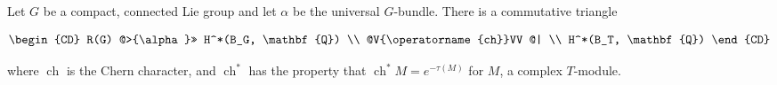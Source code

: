 Let $G$ be a compact, connected Lie group and let $\alpha$ be the universal $G$-bundle. There is a commutative triangle

\[
\begin{CD}
R(G) @>{\alpha}>> H^*(B_G, \mathbf{Q}) \\
@V{\operatorname{ch}}VV @| \\
H^*(B_T, \mathbf{Q})
\end{CD}
\]

where $\operatorname{ch}$ is the Chern character, and $\operatorname{ch}^*$ has the property that $\operatorname{ch}^* M = e^{-\tau(M)}$ for $M$, a complex $T$-module.
